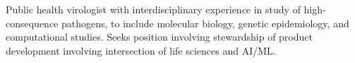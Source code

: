 

\begin{cvparagraph}

Public health virologist with interdisciplinary experience in study of high-consequence pathogens, to include molecular biology, genetic epidemiology, and computational studies. Seeks position involving stewardship of product development  involving intersection of life sciences and AI/ML.

 \vspace{-4.0mm}
\end{cvparagraph}
